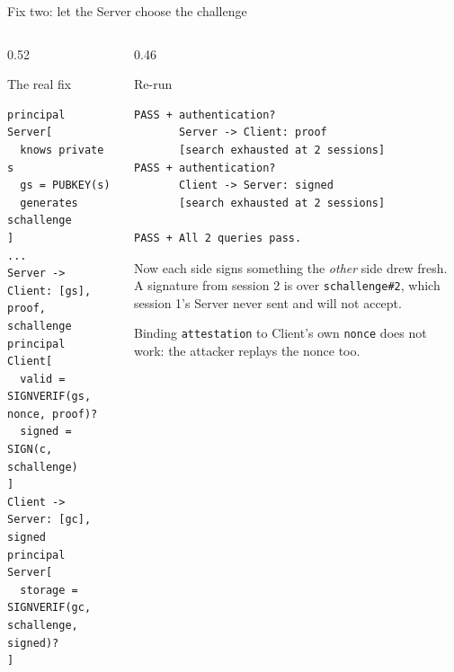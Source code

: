 \ifdefined\PRESENTATION\else\PassOptionsToClass{handout}{beamer}\fi\documentclass[aspectratio=169, lualatex]{beamer}
\newcommand{\vpcode}{\fontsize{6}{6.4}\selectfont\ttfamily\color{vpink}}
\begin{document}
\begin{frame}[fragile]{Fix two: let the Server choose the challenge}
	\begin{columns}[t]
		\begin{column}{0.52\textwidth}
			\begin{vpmodel}{The real fix}
				\begin{lstlisting}[basicstyle=\vpcode]
principal Server[
  knows private s
  gs = PUBKEY(s)
  generates schallenge
]
...
Server -> Client: [gs], proof, schallenge
principal Client[
  valid = SIGNVERIF(gs, nonce, proof)?
  signed = SIGN(c, schallenge)
]
Client -> Server: [gc], signed
principal Server[
  storage = SIGNVERIF(gc, schallenge, signed)?
]
\end{lstlisting}
			\end{vpmodel}
		\end{column}
		\begin{column}{0.46\textwidth}
			\vspace{0.2em}
			\begin{vpresult}{Re-run}
				\begin{lstlisting}[basicstyle=\vpcode]
PASS + authentication?
       Server -> Client: proof
       [search exhausted at 2 sessions]
PASS + authentication?
       Client -> Server: signed
       [search exhausted at 2 sessions]

PASS + All 2 queries pass.
\end{lstlisting}
			\end{vpresult}
			\vspace{0.2em}
			\footnotesize
			Now each side signs something the \textit{other} side drew fresh. A signature from session 2 is over \texttt{schallenge\#2}, which session 1's Server never sent and will not accept.
			\vspace{0.3em}

			Binding \texttt{attestation} to Client's own \texttt{nonce} does not work: the attacker replays the nonce too.
		\end{column}
	\end{columns}
\end{frame}
\end{document}
